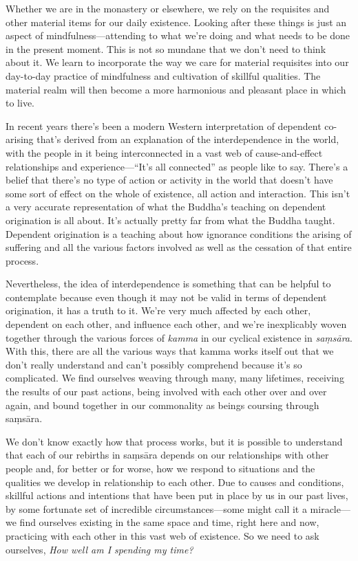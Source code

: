 Whether we are in the monastery or elsewhere, we rely on the requisites 
and other material items for our daily existence. Looking after these 
things is just an aspect of mindfulness---attending to what we're doing 
and what needs to be done in the present moment. This is not so mundane 
that we don't need to think about it. We learn to incorporate the way 
we care for material requisites into our day-to-day practice of 
mindfulness and cultivation of skillful qualities. The material realm 
will then become a more harmonious and pleasant place in which to live.


In recent years there's been a modern Western interpretation of 
dependent co-arising that's derived from an explanation of the 
interdependence in the world, with the people in it being 
interconnected in a vast web of cause-and-effect relationships and 
experience---``It's all connected'' as people like to say. There's a 
belief that there's no type of action or activity in the world that 
doesn't have some sort of effect on the whole of existence, all action 
and interaction. This isn't a very accurate representation of what the 
Buddha's teaching on dependent origination is all about. It's actually 
pretty far from what the Buddha taught. Dependent origination is a 
teaching about how ignorance conditions the arising of suffering and 
all the various factors involved as well as the cessation of that 
entire process.

Nevertheless, the idea of interdependence is something that can be 
helpful to contemplate because even though it may not be valid in terms 
of dependent origination, it has a truth to it. We're very much 
affected by each other, dependent on each other, and influence each 
other, and we're inexplicably woven together through the various forces 
of \emph{kamma} in our cyclical existence in \emph{saṃsāra}. With 
this, there are all the various ways that kamma works itself out that 
we don't really understand and can't possibly comprehend because it's 
so complicated. We find ourselves weaving through many, many lifetimes, 
receiving the results of our past actions, being involved with each 
other over and over again, and bound together in our commonality as 
beings coursing through saṃsāra.

We don't know exactly how that process works, but it is possible to 
understand that each of our rebirths in saṃsāra depends on our 
relationships with other people and, for better or for worse, how we 
respond to situations and the qualities we develop in relationship to 
each other. Due to causes and conditions, skillful actions and 
intentions that have been put in place by us in our past lives, by some 
fortunate set of incredible circumstances---some might call it a 
miracle---we find ourselves existing in the same space and time, right 
here and now, practicing with each other in this vast web of existence. 
So we need to ask ourselves, \emph{How well am I spending my time?}

